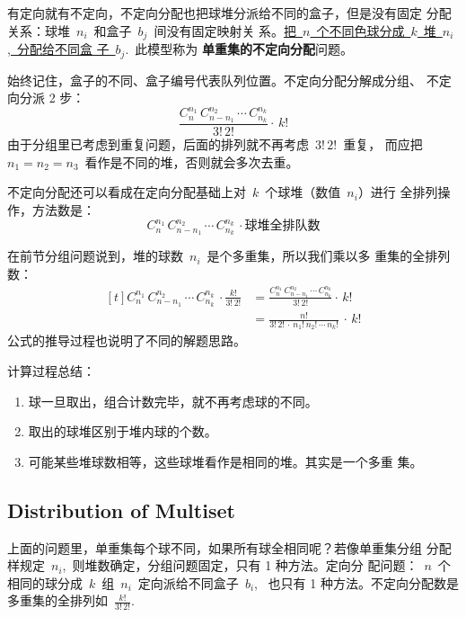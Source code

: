 有定向就有不定向，不定向分配也把球堆分派给不同的盒子，但是没有固定
分配关系：球堆~$n_i$~和盒子~$b_j$~间没有固定映射关
系。\uline{把~$n$~个不同色球分成~$k$~堆~$n_i$,~分配给不同盒
  子~$b_j$}.~此模型称为 \textbf{单重集的不定向分配}问题。

始终记住，盒子的不同、盒子编号代表队列位置。不定向分配分解成分组、
不定向分派 2 步：
\[ \frac{C_n^{n_1}\, C_{n - n_1}^{n_2}\, \cdots\, C_{n_k}^{n_k} }{
    3! \, 2! } \cdot\, k! \]
由于分组里已考虑到重复问题，后面的排列就不再考虑~$3! \, 2!$~重复，
而应把~$n_1 = n_2 = n_3$~看作是不同的堆，否则就会多次去重。

不定向分配还可以看成在定向分配基础上对~$k$~个球堆（数值~$n_i$）进行
全排列操作，方法数是：
\[ C_n^{n_1}\, C_{n - n_1}^{n_2}\, \cdots\, C_{n_k}^{n_k}\, \cdot
  \text{球堆全排队数} \]

在前节分组问题说到，堆的球数~$n_i$~是个多重集，所以我们乘以多
重集的全排列数：
\[
  \begin{aligned}[t]
    C_n^{n_1}\, C_{n - n_1}^{n_2}\, \cdots\, C_{n_k}^{n_k}\, \cdot
    \frac{ k! }{ 3! \, 2!}
    &= \frac{C_n^{n_1}\, C_{n - n_1}^{n_2}\, \cdots\, C_{n_k}^{n_k} }{
      3! \, 2! } \cdot\, k! \\
    &= \frac{n!}{ 3!\, 2!\, \cdot\, n_1!\, n_2!\, \cdots\, n_k! }\, \cdot\, k!
  \end{aligned}
\]
公式的推导过程也说明了不同的解题思路。

计算过程总结：

\begin{minipage}{1.0\linewidth}
  \begin{enumerate}
  \item 球一旦取出，组合计数完毕，就不再考虑球的不同。
  \item 取出的球堆区别于堆内球的个数。
  \item 可能某些堆球数相等，这些球堆看作是相同的堆。其实是一个多重
    集。
  \end{enumerate}
\end{minipage}

\subsection{Distribution of Multiset}
\label{sec:distr-mult}

上面的问题里，单重集每个球不同，如果所有球全相同呢？若像单重集分组
分配样规定~$n_i$,~则堆数确定，分组问题固定，只有 1 种方法。定向分
配问题：~$n$~个相同的球分成~$k$~组~$n_i$~定向派给不同盒子~$b_i$,~
也只有 1 种方法。不定向分配数是多重集的全排列如~$\frac{ k! }{ 3!
  \, 2! }$.

